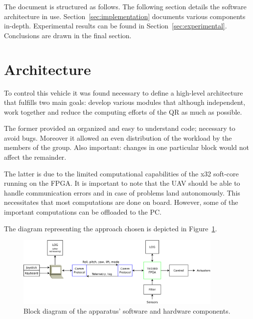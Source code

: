 \documentclass[11pt]{article}
\begin{document}
The document is structured as follows. The following section details the software architecture in use. Section~\ref{sec:implementation} documents various components in-depth. Experimental results can be found in Section~\ref{sec:experimental}. Conclusions are drawn in the final section.

\section{Architecture}
\label{sec:architecture}


To control this vehicle it was found necessary to define a high-level architecture that fulfills two main goals: develop various modules that although independent, work together and reduce the computing efforts of the QR as much as possible.

The former provided an organized and easy to understand code; necessary to avoid bugs. Moreover it allowed an even distribution of the workload by the members of the group. Also important: changes in one particular block would not affect the remainder.

The latter is due to the limited computational capabilities of the x32 soft-core running on the FPGA. It is important to note that the UAV should be able to handle communication errors and in case of problems land autonomously. This necessitates that most computations are done on board. However, some of the important computations can be offloaded to the PC.

The diagram representing the approach chosen is depicted in Figure~\ref{fig:block}.

\begin{figure}[ht]
\centering
\includegraphics[width=0.9\textwidth,keepaspectratio=true,height=0.3\textheight]{blockdiagram}
\caption{Block diagram of the apparatus' software and hardware components.}
\label{fig:block}
\end{figure}
\end{document}

